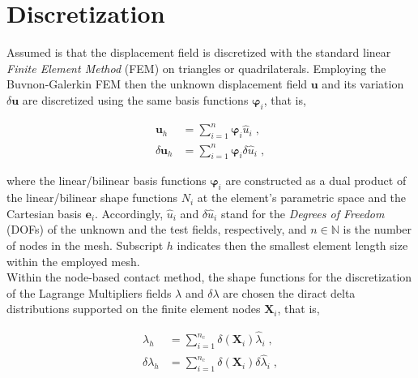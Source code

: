 \documentclass[10pt,a4paper]{article}
\begin{document}
\section{Discretization}

Assumed is that the displacement field is discretized with the standard linear \textit{Finite Element Method} (FEM) on triangles or quadrilaterals. Employing the Buvnon-Galerkin FEM then the unknown displacement field $\mathbf{u}$ and its variation $\delta \mathbf{u}$ are discretized using the same basis functions $\boldsymbol{\varphi}_i$, that is,

\begin{subequations}
	\begin{alignat}{1}
		\mathbf{u}_h &= \sum_{i = 1}^{n} \boldsymbol{\varphi}_i \hat{u}_i \;, \label{eq:discretization_u} \\
		\delta \mathbf{u}_h &= \sum_{i = 1}^n \boldsymbol{\varphi}_i \delta\hat{u}_i \;, \label{eq:discretization_delta_u}
	\end{alignat}
\end{subequations}

where the linear/bilinear basis functions $\boldsymbol{\varphi}_i$ are constructed as a dual product of the linear/bilinear shape functions $N_i$ at the element's parametric space and the Cartesian basis $\mathbf{e}_i$. Accordingly, $\hat{u}_i$ and $\delta\hat{u}_i$ stand for the \textit{Degrees of Freedom} (DOFs) of the unknown and the test fields, respectively, and $n \in \mathbb{N}$ is the number of nodes in the mesh. Subscript $h$ indicates then the smallest element length size within the employed mesh.\\

Within the node-based contact method, the shape functions for the discretization of the Lagrange Multipliers fields $\lambda$ and $\delta \lambda$ are chosen the diract delta distributions supported on the finite element nodes $\mathbf{X}_i$, that is,

\begin{subequations}
	\begin{alignat}{1}
		\lambda_h &= \sum_{i = 1}^{n_{\text{c}}} \delta(\mathbf{X}_i) \hat{\lambda}_i \;, \label{eq:discretization_lambda} \\
		\delta \lambda_h &= \sum_{i = 1}^{n_{\text{c}}} \delta(\mathbf{X}_i) \delta\hat{\lambda}_i \;, \label{eq:discretization_lambda_u}
	\end{alignat}
\end{subequations}
\end{document}
